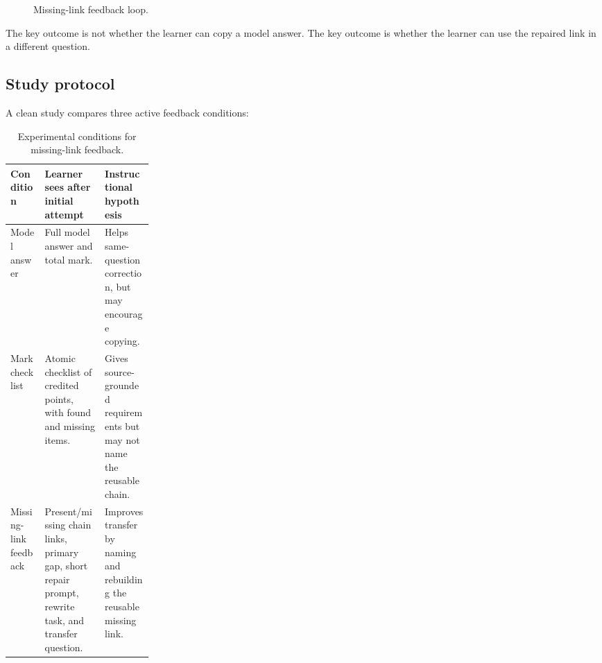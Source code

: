 \documentclass[11pt]{article}
\begin{document}
\begin{figure}[H]
\centering
{}
\caption{Missing-link feedback loop.}
\label{fig:feedbackloop}
\end{figure}

The key outcome is not whether the learner can copy a model answer. The key outcome is whether the learner can use the repaired link in a different question.

\subsection{Study protocol}

A clean study compares three active feedback conditions:

\begin{table}[H]
\centering
\small
\begin{tabularx}{\linewidth}{L{0.24\linewidth}Y Y}
\toprule
\textbf{Condition} & \textbf{Learner sees after initial attempt} & \textbf{Instructional hypothesis}\\
\midrule
Model answer & Full model answer and total mark. & Helps same-question correction, but may encourage copying.\\
Mark checklist & Atomic checklist of credited points, with found and missing items. & Gives source-grounded requirements but may not name the reusable chain.\\
Missing-link feedback & Present/missing chain links, primary gap, short repair prompt, rewrite task, and transfer question. & Improves transfer by naming and rebuilding the reusable missing link.\\
\bottomrule
\end{tabularx}
\caption{Experimental conditions for missing-link feedback.}
\label{tab:feedbackconditions}
\end{table}
\end{document}

